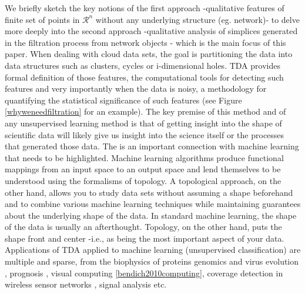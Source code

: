 \documentclass[onecollarge,runningheads]{svjour2}
\begin{document}
We briefly sketch the key notions of the first approach -qualitative features of finite set of points in $\mathcal{R}^n$ without any underlying structure (eg. network)- to delve more deeply into the second approach -qualitative analysis of simplices generated in the filtration process from network objects - which is the main focus of this paper. 
When dealing with cloud data sets, the goal is partitioning the data into data structures such as clusters, cycles or i-dimensional holes. TDA provides formal definition of those features, the computational tools for detecting such features and very importantly when the data is noisy, a methodology for quantifying the statistical significance of such features (see Figure \ref{whyweneedfiltration} for an example). The key premise of this method and of any unsupervised learning method is that of getting insight into the shape of scientific data will likely give us insight into the science itself or the processes that generated those data.
The is an important connection with machine learning that needs to be highlighted. Machine learning algorithms produce functional mappings from an input space to an output space and lend themselves to be understood using the formalisms of topology. A topological approach, on the other hand, allows you to study data sets without assuming a shape beforehand and to combine various machine learning techniques while maintaining guarantees about the underlying shape of the data. In standard machine learning, the shape of the data is usually an afterthought. Topology, on the other hand, puts the shape front and center -i.e., as being the most important aspect of your data.
Applications of TDA applied to machine learning (unsupervised classification) are multiple and sparse, from the biophysics of proteins \cite{gameiro2015topological,} genomics and virus evolution \cite{chan2013topology}, prognosis \cite{schmidt2011disease}, visual computing \ref{bendich2010computing}, coverage detection in wireless sensor networks \cite{ghrist2005coverage}, signal analysis \cite{perea2015sliding} etc.
\end{document}
